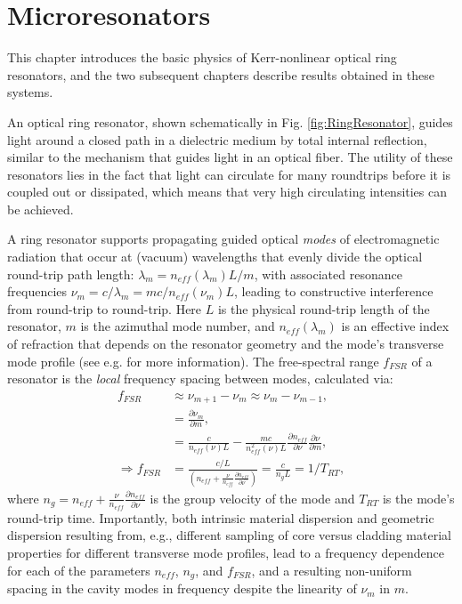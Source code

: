 \chapter{Microresonators}
 \label{ch:microresonators}
 
 This chapter introduces the basic physics of Kerr-nonlinear optical ring resonators, and the two  subsequent chapters describe results obtained in these systems.
 
An optical ring resonator, shown schematically in Fig. \ref{fig:RingResonator}, guides light around a closed path in a dielectric medium by total internal reflection, similar to the mechanism that guides light in an optical fiber. The utility of these resonators lies in the fact that light can circulate for many roundtrips before it is coupled out or dissipated, which means that very high circulating intensities can be achieved.

A ring resonator supports propagating guided optical \textit{modes} of electromagnetic radiation that occur at (vacuum) wavelengths that evenly divide the optical round-trip path length: $\lambda_m=n_{eff}(\lambda_m)L/m$, with associated resonance frequencies $\nu_m=c/\lambda_m=mc/n_{eff}(\nu_m)L$, leading to constructive interference from round-trip to round-trip. Here $L$ is the physical round-trip length of the resonator, $m$ is the azimuthal mode number, and $n_{eff}(\lambda_m)$ is an effective index of refraction that depends on the resonator geometry and the mode's transverse mode profile (see e.g. \cite{REFHERE} for more information). The free-spectral range $f_{FSR}$ of a resonator is the \textit{local} frequency spacing between modes, calculated via:
\begin{align}
	f_{FSR}&\approx \nu_{m+1}-\nu_{m}\approx \nu_{m}-\nu_{m-1},\\
	&=\frac{\partial\nu_m}{\partial m},\\
	&=\frac{c}{n_{eff}(\nu)L}-\frac{mc}{n_{eff}^2(\nu)L}\frac{\partial n_{eff}}{\partial \nu}\frac{\partial \nu}{\partial m},\\
	\Rightarrow f_{FSR}&=\frac{c/L}{\left(n_{eff}+\frac{\nu}{n_{eff}}\frac{\partial n_{eff}}{\partial \nu}\right)}=\frac{c}{n_g L}=1/T_{RT},
\end{align}
	where $n_g=n_{eff}+\frac{\nu}{n_{eff}}\frac{\partial n_{eff}}{\partial \nu}$ is the group velocity of the mode and $T_{RT}$ is the mode's round-trip time. Importantly, both intrinsic material dispersion and geometric dispersion resulting from, e.g., different sampling of core versus cladding material properties for different transverse mode profiles, lead to a frequency dependence for each of the parameters $n_{eff}$, $n_g$, and $f_{FSR}$, and a resulting non-uniform spacing in the cavity modes in frequency despite the linearity of $\nu_m$ in $m$. 
	
